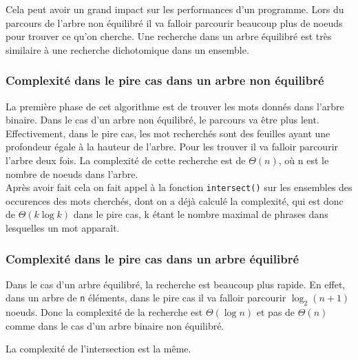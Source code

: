 \documentclass[11pt]{article}
\begin{document}
        Cela peut avoir un grand impact sur les performances d'un programme.
        Lors du parcours de l'arbre non équilibré il va falloir parcourir beaucoup
        plus de noeuds pour trouver ce qu'on cherche. Une recherche dans un arbre
        équilibré est très similaire à une recherche dichotomique dans un ensemble.


        \subsubsection{Complexité dans le pire cas dans un arbre non équilibré}
        La première phase de cet algorithme est de trouver les mots donnés dans
        l'arbre binaire. Dans le cas d'un arbre non équilibré, le parcours va être
        plus lent. Effectivement, dans le pire cas, les mot recherchés sont des
        feuilles ayant une profondeur égale à la hauteur de l'arbre. Pour les
        trouver il va falloir parcourir l'arbre deux fois. La complexité de
        cette recherche est de $\Theta(n)$, où n est le nombre de noeuds dans
        l'arbre.\\

        Après avoir fait cela on fait appel à la fonction \texttt{intersect()}
        sur les ensembles des occurences des mots cherchés, dont on a déjà
        calculé la complexité, qui est donc de $\Theta(k\log{}k)$ dans le pire cas,
        k étant le nombre maximal de phrases dans lesquelles un mot apparaît.

        \subsubsection{Complexité dans le pire cas dans un arbre équilibré}
        Dans le cas d'un arbre équilibré, la recherche est beaucoup plus rapide.
        En effet, dans un arbre de \texttt{n} éléments, dans le pire cas il va falloir
        parcourir ${\log_2(n+1)}$ noeuds. Donc la complexité de la recherche
        est $\Theta(\log{}n)$ et pas de $\Theta(n)$ comme dans le cas d'un arbre
        binaire non équilibré.

        La complexité de l'intersection est la même.

        
\end{document}
